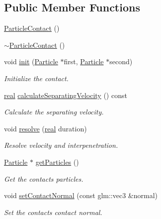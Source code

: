 \subsection*{Public Member Functions}
\begin{DoxyCompactItemize}
\item 
\mbox{\hyperlink{classr3_1_1_particle_contact_a57d3527a606d63a48816aae93d403eee}{Particle\+Contact}} ()
\item 
\mbox{\hyperlink{classr3_1_1_particle_contact_ab6524a4421fd38a282fecaf013d053a2}{$\sim$\+Particle\+Contact}} ()
\item 
void \mbox{\hyperlink{classr3_1_1_particle_contact_a1132e11eab7f76f783a6d4c8e0e63303}{init}} (\mbox{\hyperlink{classr3_1_1_particle}{Particle}} $\ast$first, \mbox{\hyperlink{classr3_1_1_particle}{Particle}} $\ast$second)
\begin{DoxyCompactList}\small\item\em Initialize the contact. \end{DoxyCompactList}\item 
\mbox{\hyperlink{namespacer3_ab2016b3e3f743fb735afce242f0dc1eb}{real}} \mbox{\hyperlink{classr3_1_1_particle_contact_a50956285c7722f209ffa5f851502e6d9}{calculate\+Separating\+Velocity}} () const
\begin{DoxyCompactList}\small\item\em Calculate the separating velocity. \end{DoxyCompactList}\item 
void \mbox{\hyperlink{classr3_1_1_particle_contact_a2878440163ead45a12454b90d3d1d774}{resolve}} (\mbox{\hyperlink{namespacer3_ab2016b3e3f743fb735afce242f0dc1eb}{real}} duration)
\begin{DoxyCompactList}\small\item\em Resolve velocity and interpenetration. \end{DoxyCompactList}\item 
\mbox{\hyperlink{classr3_1_1_particle}{Particle}} $\ast$ \mbox{\hyperlink{classr3_1_1_particle_contact_aeeacfbf5cbed36cf2be65775066e8f14}{get\+Particles}} ()
\begin{DoxyCompactList}\small\item\em Get the contact\textquotesingle{}s particles. \end{DoxyCompactList}\item 
void \mbox{\hyperlink{classr3_1_1_particle_contact_a7ed5b4704d5e4159b8e986b5dbf4d585}{set\+Contact\+Normal}} (const glm\+::vec3 \&normal)
\begin{DoxyCompactList}\small\item\em Set the contact\textquotesingle{}s contact normal. \end{DoxyCompactList}\item 

\end{DoxyCompactItemize}
